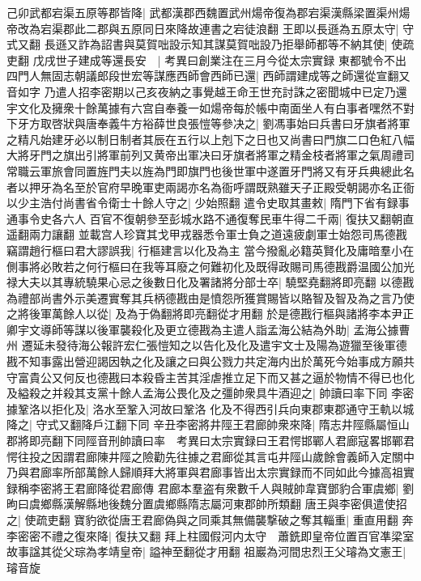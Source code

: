 己卯武都宕渠五原等郡皆降|{
	武都漢郡西魏置武州煬帝復為郡宕渠漢縣梁置渠州煬帝改為宕渠郡此二郡與五原同日來降故連書之宕徒浪翻}
王即以長遜為五原太守|{
	守式又翻}
長遜又詐為詔書與莫賀咄設示知其謀莫賀咄設乃拒舉師都等不納其使|{
	使疏吏翻}
戊戌世子建成等還長安　|{
	考異曰創業注在三月今從太宗實録}
東都號令不出四門人無固志朝議郎段世宏等謀應西師會西師已還|{
	西師謂建成等之師還從宣翻又音如字}
乃遣人招李密期以己亥夜納之事覺越王命王世充討誅之密聞城中已定乃還　宇文化及擁衆十餘萬據有六宫自奉養一如煬帝每於帳中南面坐人有白事者嘿然不對下牙方取啓狀與唐奉義牛方裕薛世良張愷等參决之|{
	劉馮事始曰兵書曰牙旗者將軍之精凡始建牙必以制日制者其辰在五行以上剋下之日也又尚書曰門旗二口色紅八幅大將牙門之旗出引將軍前列又黄帝出軍决曰牙旗者將軍之精金枝者將軍之氣周禮司常職云軍旅會同置旌門夫以旌為門即旗門也後世軍中遂置牙門將又有牙兵典總此名者以押牙為名至於官府早晚軍吏兩謁亦名為衙呼謂既熟雖天子正殿受朝謁亦名正衙}
以少主浩付尚書省令衛士十餘人守之|{
	少始照翻}
遣令史取其畫敕|{
	隋門下省有録事通事令史各六人}
百官不復朝參至彭城水路不通復奪民車牛得二千兩|{
	復扶又翻朝直遥翻兩力讓翻}
並載宫人珍寶其戈甲戎器悉令軍士負之道遠疲劇軍士始怨司馬德戡竊謂趙行樞曰君大謬誤我|{
	行樞建言以化及為主}
當今撥亂必籍英賢化及庸暗羣小在側事將必敗若之何行樞曰在我等耳廢之何難初化及既得政賜司馬德戡爵温國公加光禄大夫以其專統驍果心忌之後數日化及署諸將分部士卒|{
	驍堅堯翻將即亮翻}
以德戡為禮部尚書外示美遷實奪其兵柄德戡由是憤怨所獲賞賜皆以賂智及智及為之言乃使之將後軍萬餘人以從|{
	及為于偽翻將即亮翻從才用翻}
於是德戡行樞與諸將李本尹正卿宇文導師等謀以後軍襲殺化及更立德戡為主遣人詣孟海公結為外助|{
	孟海公據曹州}
遷延未發待海公報許宏仁張愷知之以告化及化及遣宇文士及陽為遊獵至後軍德戡不知事露出營迎謁因執之化及讓之曰與公戮力共定海内出於萬死今始事成方願共守富貴公又何反也德戡曰本殺昏主苦其淫虐推立足下而又甚之逼於物情不得已也化及縊殺之并殺其支黨十餘人孟海公畏化及之彊帥衆具牛酒迎之|{
	帥讀曰率下同}
李密據鞏洛以拒化及|{
	洛水至鞏入河故曰鞏洛}
化及不得西引兵向東郡東郡通守王軌以城降之|{
	守式又翻降戶江翻下同}
辛丑李密將井陘王君廊帥衆來降|{
	隋志井陘縣屬恒山郡將即亮翻下同陘音刑帥讀曰率　考異曰太宗實録曰王君愕邯鄲人君廊寇畧邯鄲君愕往投之因謂君廊陳井陘之險勸先往據之君廊從其言屯井陘山歲餘會義師入定關中乃與君廊率所部萬餘人歸順拜大將軍與君廊事皆出太宗實録而不同如此今據高祖實録稱李密將王君廊降從君廊傳}
君廊本羣盗有衆數千人與賊帥韋寶鄧豹合軍虞鄉|{
	劉昫曰虞鄉縣漢解縣地後魏分置虞鄉縣隋志屬河東郡帥所類翻}
唐王與李密俱遣使招之|{
	使疏吏翻}
寶豹欲從唐王君廊偽與之同乘其無備襲撃破之奪其輜重|{
	重直用翻}
奔李密密不禮之復來降|{
	復扶又翻}
拜上柱國假河内太守　蕭銑即皇帝位置百官凖梁室故事諡其從父琮為孝靖皇帝|{
	謚神至翻從才用翻}
祖巖為河間忠烈王父璿為文憲王|{
	璿音旋}
